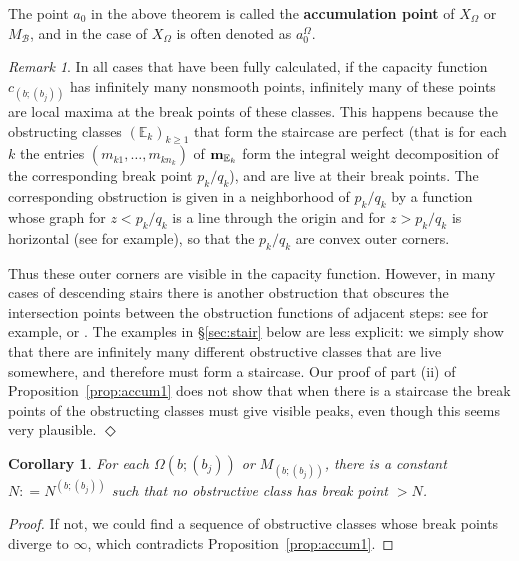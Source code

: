 \documentclass[11pt, reqno]{amsart}
\newtheorem{cor}[thm]{Corollary}
\theoremstyle{remark}
\numberwithin{equation}{subsection}
\numberwithin{figure}{section}
\theoremstyle{customremark}
\newtheorem{rmk_no_diamond}[thm]{Remark}
\newenvironment{rmk}{\begin{rmk_no_diamond} } {\hfill$\er$ \end{rmk_no_diamond}}
\newcommand{\bbm}{{\bf m}}
\newcommand{\bE}{{\mathbb E}}
\newcommand{\Om}{{\Omega}}
\newcommand{\MS}{{\medskip}}
\newcommand{\er}{{\Diamond}}
\begin{document}
The point $a_0$ in the above theorem is called the {\bf accumulation point} of $X_\Omega$ or $M_{\mathcal{B}}$, and in the case of $X_\Om$  is often denoted as $a_0^\Om$.

\begin{rmk}\label{rmk:perfectObs}\rm In all  cases that have been fully calculated,
 if the capacity function $c_{(b;(b_j))}$ has infinitely many  nonsmooth points, infinitely many of these points are local maxima at the break points of these classes.    This happens because the obstructing classes $(\bE_k)_{k\ge 1}$ that form the staircase are perfect (that is for each $k$ the entries $(m_{k1}, \dots, m_{kn_k})$ of $\bbm_{\bE_k}$ form the integral weight decomposition of the corresponding break point $p_k/q_k$), and are live at their break points.  The corresponding obstruction is given in a neighborhood of $p_k/q_k$ by a function whose graph for $z<p_k/q_k$ is a line  through the origin and for $z>p_k/q_k$ is horizontal (see \cite[Lem.16]{BHM} for example),  so that the $p_k/q_k$ are convex outer corners. 

 Thus  these outer corners are visible in the capacity function.  However, in many cases of descending stairs there is another obstruction that obscures the intersection points between the obstruction functions  of adjacent steps:  see for example, \cite[Example 32, Fig.5.3.1]{BHM} or \cite[Rmk.1.2.7]{MMW}.   The examples in \S\ref{sec:stair} below are less explicit: we simply show that there are infinitely many different
obstructive classes that are live somewhere, and therefore must form a staircase.  Our  proof of 
part (ii) of Proposition~\ref{prop:accum1}  does not show that when there is a staircase  the break points of the obstructing classes must give visible peaks, even though this seems very plausible. 
\end{rmk}
\MS

\begin{cor}\label{cor:accum1}  For each  $\Omega(b;(b_j))$ or $M_{(b;(b_j))}$, there is a constant  $N: = N^{(b;(b_j))}$ such that no obstructive class has break point $> N$.
\end{cor}
\begin{proof} If not, we could find a sequence of obstructive classes  whose break points diverge to $\infty$, which contradicts Proposition~\ref{prop:accum1}.
\end{proof}
\end{document}
